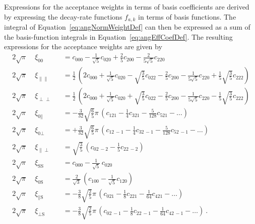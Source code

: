 Expressions for the acceptance weights in terms of basis coefficients are derived by expressing the decay-rate functions $f_{a,k}$ in terms
of basis functions. The integral of Equation~\ref{eq:angNormWeightDef} can then be expressed as a sum of the basis-function integrals in
Equation~\ref{eq:angEffCoefDef}. The resulting expressions for the acceptance weights are given by
\begin{equation}
  \label{eq:angCoefToWeight}
  \begin{alignedat}{2}
    2\sqrt{\pi}\; &\xi_{\text{00}} &
      &= c_{000} - \tfrac{1}{\sqrt{5}} c_{020} + \tfrac{2}{5} c_{200} - \tfrac{2}{5\sqrt{5}} c_{220} \\
    2\sqrt{\pi}\; &\xi_{\parallel\parallel} &
      &= \tfrac{1}{2}\,(2 c_{000} + \tfrac{1}{\sqrt{5}} c_{020} - \sqrt{\tfrac{3}{5}} c_{022} - \tfrac{2}{5} c_{200}
         - \tfrac{1}{5\sqrt{5}} c_{220} + \tfrac{1}{5}\sqrt{\tfrac{3}{5}} c_{222}) \\
    2\sqrt{\pi}\; &\xi_{\perp\perp} &
      &= \tfrac{1}{2}\,(2 c_{000} + \tfrac{1}{\sqrt{5}} c_{020} + \sqrt{\tfrac{3}{5}} c_{022} - \tfrac{2}{5} c_{200}
         - \tfrac{1}{5\sqrt{5}} c_{220} - \tfrac{1}{5}\sqrt{\tfrac{3}{5}} c_{222}) \\
    2\sqrt{\pi}\; &\xi_{\text{0}\parallel} &
      &= -\tfrac{3}{32}\sqrt{\tfrac{6}{5}}\pi\, (c_{121} - \tfrac{1}{4} c_{321} - \tfrac{5}{128} c_{521} - \ldots) \\
    2\sqrt{\pi}\; &\xi_{\text{0}\perp} &
      &= +\tfrac{3}{32}\sqrt{\tfrac{6}{5}}\pi\, (c_{12\,-1} - \tfrac{1}{4} c_{32\,-1} - \tfrac{5}{128} c_{52\,-1} - \ldots) \\
    2\sqrt{\pi}\; &\xi_{\parallel\perp} &
      &= \sqrt{\tfrac{3}{5}}\, (c_{02\,-2} - \tfrac{1}{5} c_{22\,-2}) \\
    2\sqrt{\pi}\; &\xi_{\text{SS}} &
      &= c_{000} - \tfrac{1}{\sqrt{5}}\,c_{020} \\
    2\sqrt{\pi}\; &\xi_{\text{0S}} &
      &= \tfrac{2}{\sqrt{3}}\, (c_{100} - \tfrac{1}{\sqrt{5}} c_{120}) \\
    2\sqrt{\pi}\; &\xi_{\parallel\text{S}} &
      &= -\tfrac{3}{8}\sqrt{\tfrac{2}{5}}\pi\, (c_{021} - \tfrac{1}{8} c_{221} - \tfrac{1}{64} c_{421} - \ldots) \\
    2\sqrt{\pi}\; &\xi_{\perp\text{S}} &
      &= -\tfrac{3}{8}\sqrt{\tfrac{2}{5}}\pi\, (c_{02\,-1} - \tfrac{1}{8} c_{22\,-1} - \tfrac{1}{64} c_{42\,-1} - \ldots) \ .
  \end{alignedat}
\end{equation}
